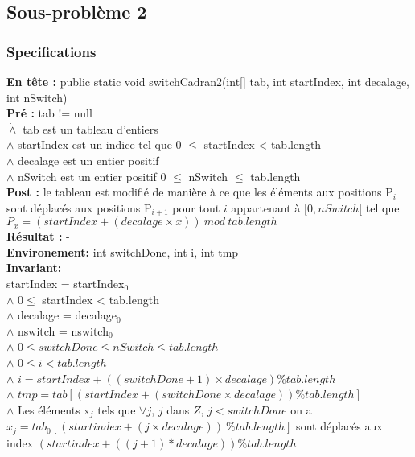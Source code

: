 \subsection{Sous-problème 2}

\subsubsection*{Specifications}
\noindent \textbf{En tête :} public static void switchCadran2(int[] tab, int startIndex, int decalage, int nSwitch)\\
\noindent \textbf{Pré : } tab != null \\
 	  \indent \indent $\dot{\wedge}$ tab est un tableau d'entiers\\
	  \indent \indent $\wedge$ startIndex est un indice tel que 0 $\leq$ startIndex < tab.length \\
	  \indent \indent $\wedge$ decalage est un entier positif \\
	  \indent \indent $\wedge$ nSwitch est un entier positif 0 $\leq$ nSwitch $\leq$ tab.length\\
\textbf{Post :}  le tableau est modifié de manière à ce que les éléments aux positions P$_{i}$ sont déplacés aux positions P$_{i+1}$ pour tout $i$ appartenant à $[0,nSwitch[$ tel que $P_{x} = (startIndex + (decalage\times x))\ mod\ tab.length$\\
\textbf{Résultat :}  - \\
\textbf{Environement: } int switchDone, int i, int tmp\\

\noindent \textbf{Invariant:}\\
\noindent startIndex = startIndex$_{0}$\\
$\wedge$ $0 \leq$ startIndex < tab.length \\
$\wedge$ decalage = decalage$_{0}$\\
$\wedge$ nswitch = nswitch$_{0}$\\
$\wedge$ $0\leq switchDone \leq nSwitch \leq tab.length$\\
$\wedge$ $0\leq i < tab.length$\\
$\wedge$ $i = startIndex + ((switchDone+1)\times decalage) \% tab.length$\\
$\wedge$ $tmp = tab[(startIndex + (switchDone\times decalage))  \% tab.length]$\\
$\wedge$ Les éléments x$_{j}$ tels que $\forall j$, $j$ dans $Z$, $j<switchDone$ on a $x_{j}=tab_{0}[(startindex + (j\times decalage))\ \% tab.length]$ sont déplacés aux index $(startindex + ((j+1)* decalage))\%tab.length$\\


